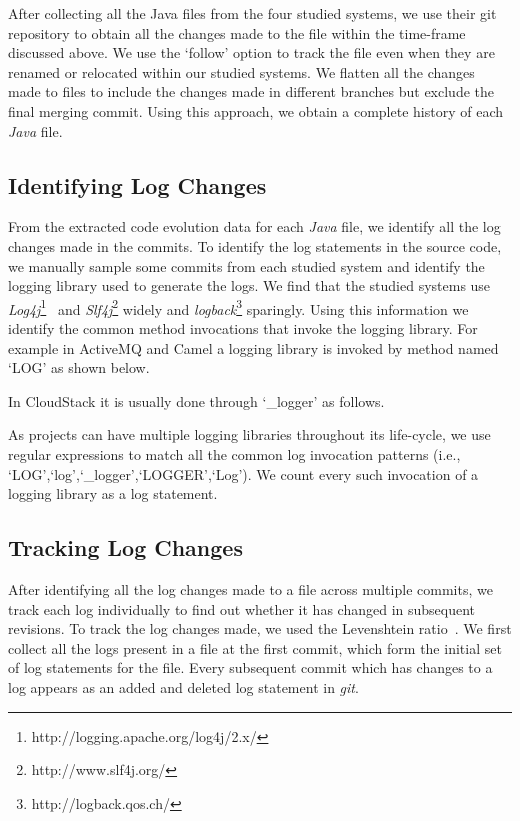  After collecting all the Java files from the four studied systems, we use their git repository to obtain all the changes made to the file within the time-frame discussed above. We use the `follow' option to track the file even when they are renamed or relocated within our studied systems. We flatten all the changes made to files to include the changes made in different branches but exclude the final merging commit. Using this approach, we obtain a complete history of each \emph{Java} file. 

\subsection{Identifying Log Changes}
From the extracted code evolution data for each \emph{Java} file, we identify all the log changes made in the commits. To identify the log statements in the source code, we manually sample some commits from each studied system and identify the logging library used to generate the logs. We find that the studied systems use \textsl{Log4j}\footnote{http://logging.apache.org/log4j/2.x/}~\cite{EMSEIAN} and \textsl{Slf4j}\footnote{http://www.slf4j.org/} widely and \textsl{logback}\footnote{http://logback.qos.ch/} sparingly. Using this information we identify the common method invocations that invoke the logging library. For example in  ActiveMQ and Camel a logging library is invoked by method named `LOG' as shown below.

In CloudStack it is usually done through `\_logger' as follows.


As projects can have multiple logging libraries throughout its life-cycle, we use regular expressions to match all the common log invocation patterns (i.e., `LOG',`log',`\_logger',`LOGGER',`Log'). We count every such invocation of a logging library as a log statement.


\subsection{Tracking Log Changes}
After identifying all the log changes made to a file across multiple commits, we track each log individually to find out whether it has changed in subsequent revisions. To track the log changes made, we used the Levenshtein ratio~\cite{levenshteinratio}. We first collect all the logs present in a file at the first commit, which form the initial set of log statements for the file. Every subsequent commit which has changes to a log appears as an added and deleted log statement in \textsl{git}.  

